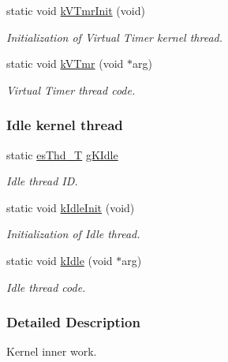 \begin{DoxyCompactItemize}
static void \hyperlink{group__kern__impl_gaa03a91aeb99719724bc64c292f1a5959}{k\-V\-Tmr\-Init} (void)
\begin{DoxyCompactList}\small\item\em Initialization of Virtual Timer kernel thread. \end{DoxyCompactList}\item 
static void \hyperlink{group__kern__impl_gadef1fcf2218955344b2e1d5027f80bee}{k\-V\-Tmr} (void $\ast$arg)
\begin{DoxyCompactList}\small\item\em Virtual Timer thread code. \end{DoxyCompactList}\end{DoxyCompactItemize}
\subsubsection*{Idle kernel thread}
\begin{DoxyCompactItemize}
\item 
static \hyperlink{group__kern__intf_ga62e3a3ca0a4597a19c43cb8868810d82}{es\-Thd\-\_\-\-T} \hyperlink{group__kern__impl_gad32c3bee0b16ff9c156476f04200fc0a}{g\-K\-Idle}
\begin{DoxyCompactList}\small\item\em Idle thread I\-D. \end{DoxyCompactList}\item 
static void \hyperlink{group__kern__impl_ga39cf986cee12aa37a066532e80a5f72a}{k\-Idle\-Init} (void)
\begin{DoxyCompactList}\small\item\em Initialization of Idle thread. \end{DoxyCompactList}\item 
static void \hyperlink{group__kern__impl_ga4e968162935156b6617ff0d5cbccbe1c}{k\-Idle} (void $\ast$arg)
\begin{DoxyCompactList}\small\item\em Idle thread code. \end{DoxyCompactList}\end{DoxyCompactItemize}


\subsubsection{Detailed Description}
Kernel inner work. 

